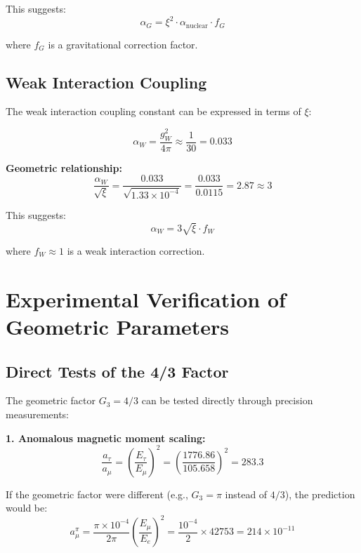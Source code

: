 \documentclass[12pt,a4paper]{report}
\begin{document}
	This suggests:
	\begin{equation}
		\alpha_G = \xi^2 \cdot \alpha_{\text{nuclear}} \cdot f_G
	\end{equation}
	
	where $f_G$ is a gravitational correction factor.
	
	\subsection{Weak Interaction Coupling}
	\label{subsec:weak_coupling}
	
	The weak interaction coupling constant can be expressed in terms of $\xi$:
	
	\begin{equation}
		\alpha_W = \frac{g_W^2}{4\pi} \approx \frac{1}{30} = 0.033
	\end{equation}
	
	\textbf{Geometric relationship:}
	\begin{equation}
		\frac{\alpha_W}{\sqrt{\xi}} = \frac{0.033}{\sqrt{1.33 \times 10^{-4}}} = \frac{0.033}{0.0115} = 2.87 \approx 3
	\end{equation}
	
	This suggests:
	\begin{equation}
		\alpha_W = 3\sqrt{\xi} \cdot f_W
	\end{equation}
	
	where $f_W \approx 1$ is a weak interaction correction.
	
	\section{Experimental Verification of Geometric Parameters}
	\label{sec:experimental_verification}
	
	\subsection{Direct Tests of the 4/3 Factor}
	\label{subsec:direct_tests}
	
	The geometric factor $G_3 = 4/3$ can be tested directly through precision measurements:
	
	\textbf{1. Anomalous magnetic moment scaling:}
	\begin{equation}
		\frac{a_\tau}{a_\mu} = \left(\frac{E_\tau}{E_\mu}\right)^2 = \left(\frac{1776.86}{105.658}\right)^2 = 283.3
	\end{equation}
	
	If the geometric factor were different (e.g., $G_3 = \pi$ instead of $4/3$), the prediction would be:
	\begin{equation}
		a_\mu^{\pi} = \frac{\pi \times 10^{-4}}{2\pi} \left(\frac{E_\mu}{E_e}\right)^2 = \frac{10^{-4}}{2} \times 42753 = 214 \times 10^{-11}
	\end{equation}
	
\end{document}
